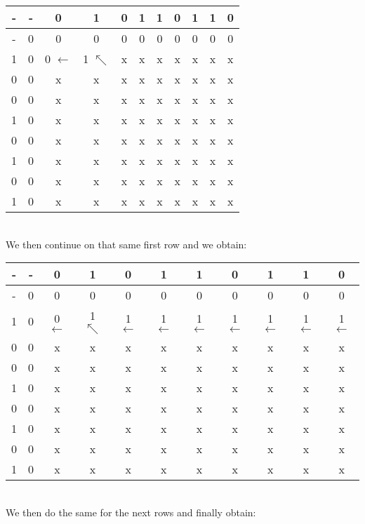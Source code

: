 \documentclass[11pt]{article}
\begin{document}
\begin{enumerate}
    \begin{tabular}{ c | c c c c c c c c c c } 
        - & - & 0 & 1 & 0 & 1 & 1 & 0 & 1 & 1 & 0 \\
        \hline
        - & 0 & 0 & 0 & 0 & 0 & 0 & 0 & 0 & 0 & 0 \\
        1 & 0 & 0 $\leftarrow$ & 1 $\nwarrow$ & x & x & x & x & x & x & x \\
        0 & 0 & x & x & x & x & x & x & x & x & x \\
        0 & 0 & x & x & x & x & x & x & x & x & x \\
        1 & 0 & x & x & x & x & x & x & x & x & x \\
        0 & 0 & x & x & x & x & x & x & x & x & x \\
        1 & 0 & x & x & x & x & x & x & x & x & x \\
        0 & 0 & x & x & x & x & x & x & x & x & x \\
        1 & 0 & x & x & x & x & x & x & x & x & x \\
    \end{tabular}
    \\ We then continue on that same first row and we obtain: \\
    \begin{tabular}{ c | c c c c c c c c c c } 
        - & - & 0 & 1 & 0 & 1 & 1 & 0 & 1 & 1 & 0 \\
        \hline
        - & 0 & 0 & 0 & 0 & 0 & 0 & 0 & 0 & 0 & 0 \\
        1 & 0 & 0 $\leftarrow$ & 1 $\nwarrow$ & 1 $\leftarrow$ & 1 $\leftarrow$ & 1 $\leftarrow$ & 1 $\leftarrow$ & 1 $\leftarrow$ & 1 $\leftarrow$ & 1 $\leftarrow$ \\
        0 & 0 & x & x & x & x & x & x & x & x & x \\
        0 & 0 & x & x & x & x & x & x & x & x & x \\
        1 & 0 & x & x & x & x & x & x & x & x & x \\
        0 & 0 & x & x & x & x & x & x & x & x & x \\
        1 & 0 & x & x & x & x & x & x & x & x & x \\
        0 & 0 & x & x & x & x & x & x & x & x & x \\
        1 & 0 & x & x & x & x & x & x & x & x & x \\
    \end{tabular}
    \\ We then do the same for the next rows and finally obtain: \\

\end{enumerate}
\end{document}
